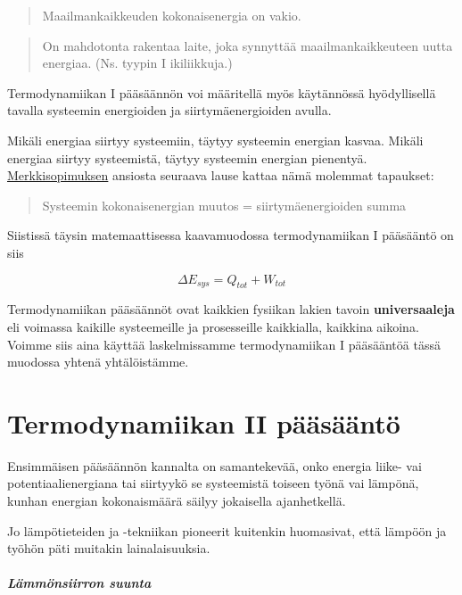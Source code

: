 \documentclass[12pt,a4paper,finnish]{book}
\begin{document}
\begin{quote}
 Maailmankaikkeuden kokonaisenergia on vakio.
\end{quote}

\begin{quote}
 On mahdotonta rakentaa laite, joka synnyttää maailmankaikkeuteen uutta energiaa. (Ns. tyypin I ikiliikkuja.)
\end{quote}

Termodynamiikan I pääsäännön voi määritellä myös käytännössä hyödyllisellä tavalla 
systeemin energioiden ja siirtymäenergioiden avulla. 

Mikäli energiaa siirtyy systeemiin, 
täytyy systeemin energian kasvaa. Mikäli energiaa siirtyy systeemistä, täytyy systeemin 
energian pienentyä. \hyperref[sec:merkkisopimus]{Merkkisopimuksen} ansiosta seuraava 
lause kattaa nämä molemmat tapaukset:

\begin{quote}
 Systeemin kokonaisenergian muutos = siirtymäenergioiden summa
\end{quote}

Siistissä täysin matemaattisessa kaavamuodossa termodynamiikan I pääsääntö on siis

\begin{equation}
 \Delta E_{sys} = Q_{tot} + W_{tot}
\end{equation}

Termodynamiikan pääsäännöt ovat kaikkien fysiikan lakien tavoin \textbf{universaaleja} 
eli voimassa kaikille systeemeille ja prosesseille kaikkialla, kaikkina aikoina. Voimme 
siis aina käyttää laskelmissamme termodynamiikan I pääsääntöä tässä muodossa yhtenä 
yhtälöistämme.


\chapter{Termodynamiikan II pääsääntö}

Ensimmäisen pääsäännön kannalta on samantekevää, onko energia liike- vai potentiaalienergiana tai 
siirtyykö se systeemistä toiseen työnä vai lämpönä, kunhan energian kokonaismäärä säilyy jokaisella 
ajanhetkellä.

Jo lämpötieteiden ja -tekniikan pioneerit kuitenkin huomasivat, että lämpöön ja työhön päti muitakin
lainalaisuuksia.

\paragraph{Lämmönsiirron suunta}
\end{document}
